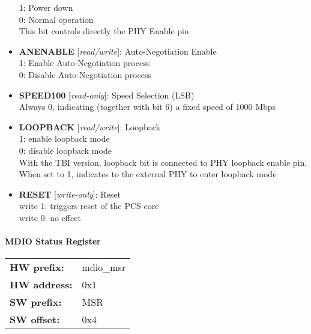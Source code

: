 \begin{itemize}
\begin{small}
1: Power down \\				                0: Normal operation \\				                This bit controls directly the PHY Enable pin
\end{small}
\item \begin{small}
{\bf 
ANENABLE
} [\emph{read/write}]: Auto-Negotiation Enable
\\
1: Enable Auto-Negotiation process \\				                0: Disable Auto-Negotiation process
\end{small}
\item \begin{small}
{\bf 
SPEED100
} [\emph{read-only}]: Speed Selection (LSB)
\\
Always 0, indicating (together with bit 6) a fixed speed of 1000 Mbps
\end{small}
\item \begin{small}
{\bf 
LOOPBACK
} [\emph{read/write}]: Loopback
\\
1: enable loopback mode \\				                0: disable loopback mode \\				 With the TBI version, loopback bit is connected to PHY loopback enable pin. When set to 1, indicates to the external PHY to enter loopback mode
\end{small}
\item \begin{small}
{\bf 
RESET
} [\emph{write-only}]: Reset
\\
write 1: triggers reset of the PCS core\\				                write 0: no effect
\end{small}
\end{itemize}
\paragraph*{MDIO Status Register}\vspace{12pt}

\begin{tabular}{l l }
{\bf HW prefix:}  & mdio\_msr\\
{\bf HW address:}  & 0x1\\
{\bf SW prefix:}  & MSR\\
{\bf SW offset:}  & 0x4\\
\end{tabular}


